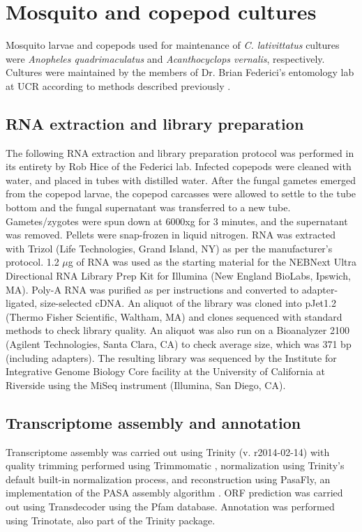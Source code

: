\section*{Mosquito and copepod cultures}
Mosquito larvae and copepods used for maintenance of \textit{C. lativittatus} cultures were \textit{Anopheles quadrimaculatus} and \textit{Acanthocyclops vernalis}, respectively. Cultures were maintained by the members of Dr. Brian Federici's entomology lab at UCR according to methods described previously \cite{Federici1983}.\\
\subsection*{RNA extraction and library preparation}
The following RNA extraction and library preparation protocol was performed in its entirety by Rob Hice of the Federici lab. Infected copepods were cleaned with water, and placed in tubes with distilled water. After the fungal gametes emerged from the copepod larvae, the copepod carcasses were allowed to settle to the tube bottom and the fungal supernatant was transferred to a new tube. Gametes/zygotes were spun down at 6000xg for 3 minutes, and the supernatant was removed. Pellets were snap-frozen in liquid nitrogen. RNA was extracted with Trizol  (Life Technologies, Grand Island, NY) as per the manufacturer's protocol. 1.2 $\mu$g of RNA was used as the starting material for the NEBNext Ultra Directional RNA Library Prep Kit for Illumina (New England BioLabs, Ipswich, MA). Poly-A RNA was purified as per instructions and converted to adapter-ligated, size-selected cDNA. An aliquot of the library was cloned into pJet1.2 (Thermo Fisher Scientific, Waltham, MA) and clones sequenced with standard methods to check library quality. An aliquot was also run on a Bioanalyzer 2100 (Agilent Technologies, Santa Clara, CA) to check average size, which was 371 bp (including adapters). The resulting library was sequenced by the Institute for Integrative Genome Biology Core facility at the University of California at Riverside using the MiSeq instrument (Illumina, San Diego, CA).\\

\subsection*{Transcriptome assembly and annotation}
Transcriptome assembly was carried out using Trinity (v. r2014-02-14) \cite{Grabherr2011} with quality trimming performed using Trimmomatic \cite{Bolger2014}, normalization using Trinity's default built-in normalization process, and reconstruction using PasaFly, an implementation of the PASA assembly algorithm \cite{Haas2013}. ORF prediction was carried out using Transdecoder \cite{Haas2013} using the Pfam database. Annotation was performed using Trinotate, also part of the Trinity package.\\

